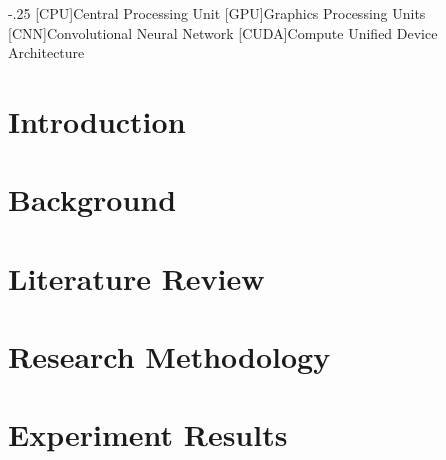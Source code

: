 \documentclass[headsepline,footsepline,footinclude=True,oneside,draft,fontsize=11pt,paper=a4,listof=totoc,bibliography=totoc]{scrbook} %
\begin{document}

\setcounter{secnumdepth}{3}



\frontmatter{}







\tableofcontents{}

\listoffigures{}
\listoftables{}

\begin{acronym}
	\itemsep-.25\baselineskip
	[CPU]{Central Processing Unit}
	[GPU]{Graphics Processing Units }
	[CNN]{Convolutional Neural Network}
	[CUDA]{Compute Unified Device Architecture}
\end{acronym}

\mainmatter{}


\chapter{Introduction}


\chapter{Background}
\label{chapter:02_background}


\chapter{Literature Review}
\label{chapter:03_literature_review}


\chapter{Research Methodology}
\label{chapter:04_research_methodo}


\chapter{Experiment Results}
\label{chapter:05_experiment_results}

\end{document}
